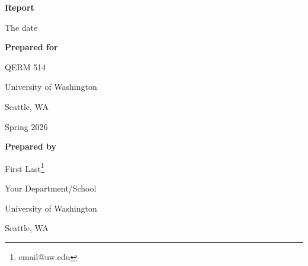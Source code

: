 \begin{center}

\textbf{Report}

The date

\vspace{0.25in}

\textbf{Prepared for}

QERM 514

\setlength{\parskip}{1pt}

University of Washington   

Seattle, WA

Spring 2026

\setlength{\parskip}{8pt}

\vspace{0.25in}

\textbf{Prepared by}

First Last\footnote{email@uw.edu}

\small

Your Department/School

\setlength{\parskip}{1pt}

University of Washington

Seattle, WA

\normalsize

\setlength{\parskip}{8pt}

\end{center}

\newpage

